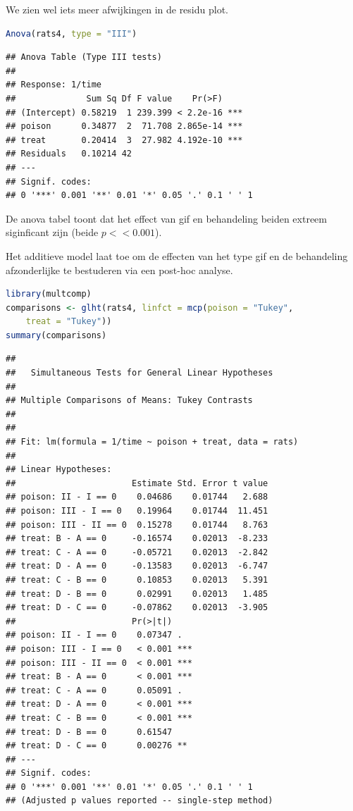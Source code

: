 \documentclass[
  12pt,dutch,coursenotes]{book}
\begin{document}
We zien wel iets meer afwijkingen in de residu plot.

\begin{lstlisting}[language=R]
Anova(rats4, type = "III")
\end{lstlisting}

\begin{lstlisting}
## Anova Table (Type III tests)
## 
## Response: 1/time
##              Sum Sq Df F value    Pr(>F)    
## (Intercept) 0.58219  1 239.399 < 2.2e-16 ***
## poison      0.34877  2  71.708 2.865e-14 ***
## treat       0.20414  3  27.982 4.192e-10 ***
## Residuals   0.10214 42                      
## ---
## Signif. codes:  
## 0 '***' 0.001 '**' 0.01 '*' 0.05 '.' 0.1 ' ' 1
\end{lstlisting}

De anova tabel toont dat het effect van gif en behandeling beiden extreem siginficant zijn (beide \(p<< 0.001\)).

Het additieve model laat toe om de effecten van het type gif en de behandeling afzonderlijke te bestuderen via een post-hoc analyse.

\begin{lstlisting}[language=R]
library(multcomp)
comparisons <- glht(rats4, linfct = mcp(poison = "Tukey",
    treat = "Tukey"))
summary(comparisons)
\end{lstlisting}

\begin{lstlisting}
## 
##   Simultaneous Tests for General Linear Hypotheses
## 
## Multiple Comparisons of Means: Tukey Contrasts
## 
## 
## Fit: lm(formula = 1/time ~ poison + treat, data = rats)
## 
## Linear Hypotheses:
##                       Estimate Std. Error t value
## poison: II - I == 0    0.04686    0.01744   2.688
## poison: III - I == 0   0.19964    0.01744  11.451
## poison: III - II == 0  0.15278    0.01744   8.763
## treat: B - A == 0     -0.16574    0.02013  -8.233
## treat: C - A == 0     -0.05721    0.02013  -2.842
## treat: D - A == 0     -0.13583    0.02013  -6.747
## treat: C - B == 0      0.10853    0.02013   5.391
## treat: D - B == 0      0.02991    0.02013   1.485
## treat: D - C == 0     -0.07862    0.02013  -3.905
##                       Pr(>|t|)    
## poison: II - I == 0    0.07347 .  
## poison: III - I == 0   < 0.001 ***
## poison: III - II == 0  < 0.001 ***
## treat: B - A == 0      < 0.001 ***
## treat: C - A == 0      0.05091 .  
## treat: D - A == 0      < 0.001 ***
## treat: C - B == 0      < 0.001 ***
## treat: D - B == 0      0.61547    
## treat: D - C == 0      0.00276 ** 
## ---
## Signif. codes:  
## 0 '***' 0.001 '**' 0.01 '*' 0.05 '.' 0.1 ' ' 1
## (Adjusted p values reported -- single-step method)
\end{lstlisting}
\end{document}
